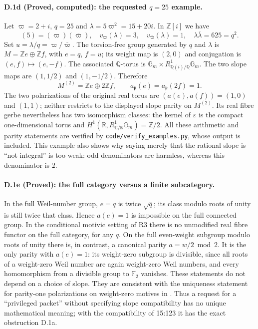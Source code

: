 \paragraph{D.1d (Proved, computed): the requested $q=25$ example.}
Let $\varpi=2+i$, $q=25$ and
$\lambda=5\varpi^2=15+20i$. In $\mathbb Z[i]$ we have
\[
 (5)=(\varpi)(\overline\varpi),\quad
 v_{\varpi}(\lambda)=3,\quad v_{\overline\varpi}(\lambda)=1,
 \quad\lambda\overline\lambda=625=q^2.
\]
Set $u=\lambda/q=\varpi/\overline\varpi$. The torsion-free group generated by
$q$ and $\lambda$ is $M=\mathbb Ze\oplus\mathbb Zf$, with $e=q$, $f=u$;
its weight map is $(2,0)$ and conjugation is $(e,f)\mapsto(e,-f)$. The
associated $\mathbb Q$-torus is
$\mathbb G_m\times R^1_{\mathbb Q(i)/\mathbb Q}\mathbb G_m$. The two slope
maps are $(1,1/2)$ and $(1,-1/2)$. Therefore
\[
 M^{(2)}=\mathbb Ze\oplus2\mathbb Zf,
 \qquad a_{\mathfrak p}(e)=a_{\mathfrak p}(2f)=1.
\]
The two polarizations of the original real torus are $(a(e),a(f))=(1,0)$ and
$(1,1)$; neither restricts to the displayed slope parity on $M^{(2)}$.
Its real fibre gerbe nevertheless has two isomorphism classes: the kernel
of $\varepsilon$ is the compact one-dimensional torus and
$H^1(\mathbb R,R^1_{\mathbb C/\mathbb R}\mathbb G_m)=\mathbb Z/2$.
All these arithmetic and parity statements are verified by
\texttt{code/verify\_examples.py}, whose output is included. This example also
shows why saying merely that the rational slope is ``not integral'' is too
weak: odd denominators are harmless, whereas this denominator is $2$.

\paragraph{D.1e (Proved): the full category versus a finite subcategory.}
In the full Weil-number group, $e=q$ is twice $\sqrt q$; its class modulo roots
of unity is still twice that class. Hence $a(e)=1$ is impossible on the full
connected group. In the conditional motivic setting of R3 there is no
unmodified real fibre functor on the full category, for any $q$.
On the full even-weight subgroup modulo roots of unity there is, in contrast,
a canonical parity $a=w/2\bmod2$. It is the only parity with $a(e)=1$:
its weight-zero subgroup is divisible, since all roots of a weight-zero
Weil number are again weight-zero Weil numbers, and every homomorphism from
a divisible group to $\mathbb F _2$ vanishes. These statements do not depend
on a choice of slope. They are consistent with the uniqueness statement
for parity-one polarizations on weight-zero motives in
\citet[Lemma 2.46]{D_Milne1994}. Thus a request for a ``privileged packet''
without specifying slope compatibility has no unique mathematical meaning;
with the compatibility of 15:123 it has the exact obstruction D.1a.

